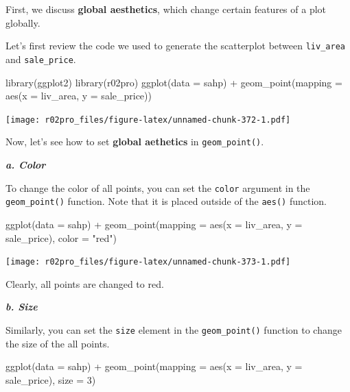 \documentclass[
]{book}
\newenvironment{Shaded}{\begin{snugshade}}{\end{snugshade}}
\newcommand{\AttributeTok}[1]{\textcolor[rgb]{0.77,0.63,0.00}{#1}}
\newcommand{\DecValTok}[1]{\textcolor[rgb]{0.00,0.00,0.81}{#1}}
\newcommand{\FunctionTok}[1]{\textcolor[rgb]{0.00,0.00,0.00}{#1}}
\newcommand{\NormalTok}[1]{#1}
\newcommand{\SpecialCharTok}[1]{\textcolor[rgb]{0.00,0.00,0.00}{#1}}
\newcommand{\StringTok}[1]{\textcolor[rgb]{0.31,0.60,0.02}{#1}}
\begin{document}
First, we discuss \textbf{global aesthetics}, which change certain features of a plot globally.

Let's first review the code we used to generate the scatterplot between \texttt{liv\_area} and \texttt{sale\_price}.

\begin{Shaded}
\begin{Highlighting}[]
\FunctionTok{library}\NormalTok{(ggplot2)}
\FunctionTok{library}\NormalTok{(r02pro)}
\FunctionTok{ggplot}\NormalTok{(}\AttributeTok{data =}\NormalTok{ sahp) }\SpecialCharTok{+} \FunctionTok{geom\_point}\NormalTok{(}\AttributeTok{mapping =} \FunctionTok{aes}\NormalTok{(}\AttributeTok{x =}\NormalTok{ liv\_area, }\AttributeTok{y =}\NormalTok{ sale\_price))}
\end{Highlighting}
\end{Shaded}

\texttt{[image: r02pro\_files/figure-latex/unnamed-chunk-372-1.pdf]}

Now, let's see how to set \textbf{global aethetics} in \texttt{geom\_point()}.

\textbf{\emph{a. Color}}

To change the color of all points, you can set the \texttt{color} argument in the \texttt{geom\_point()} function. Note that it is placed outside of the \texttt{aes()} function.

\begin{Shaded}
\begin{Highlighting}[]
\FunctionTok{ggplot}\NormalTok{(}\AttributeTok{data =}\NormalTok{ sahp) }\SpecialCharTok{+} \FunctionTok{geom\_point}\NormalTok{(}\AttributeTok{mapping =} \FunctionTok{aes}\NormalTok{(}\AttributeTok{x =}\NormalTok{ liv\_area, }\AttributeTok{y =}\NormalTok{ sale\_price), }\AttributeTok{color =} \StringTok{"red"}\NormalTok{)}
\end{Highlighting}
\end{Shaded}

\texttt{[image: r02pro\_files/figure-latex/unnamed-chunk-373-1.pdf]}

Clearly, all points are changed to red.

\textbf{\emph{b. Size}}

Similarly, you can set the \texttt{size} element in the \texttt{geom\_point()} function to change the size of the all points.

\begin{Shaded}
\begin{Highlighting}[]
\FunctionTok{ggplot}\NormalTok{(}\AttributeTok{data =}\NormalTok{ sahp) }\SpecialCharTok{+} \FunctionTok{geom\_point}\NormalTok{(}\AttributeTok{mapping =} \FunctionTok{aes}\NormalTok{(}\AttributeTok{x =}\NormalTok{ liv\_area, }\AttributeTok{y =}\NormalTok{ sale\_price), }\AttributeTok{size =} \DecValTok{3}\NormalTok{)}
\end{Highlighting}
\end{Shaded}
\end{document}
